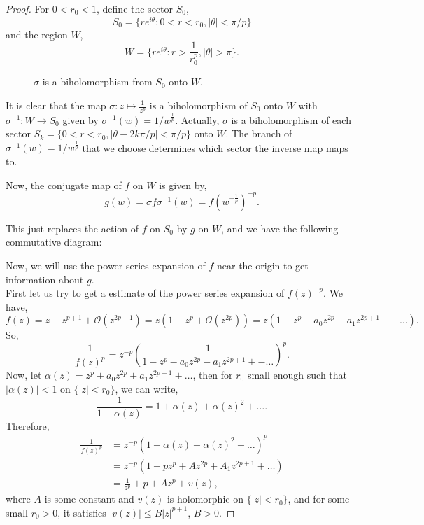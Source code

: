 \begin{proof}
	For \( 0<r_0<1 \), define the sector \( S_0 \), \[
		S_0=\{re^{i\theta}:0<r<r_0,|\theta |<\pi /p \}
	\] and the region \( W \), \[
	W=\{re^{i\theta }:r>\frac{1}{r_0^p},|\theta |>\pi\}
	.\] 

\begin{figure}[ht] \centering
    \caption{$\sigma$ is a biholomorphism from $S_0$ onto $W$.}
    \label{sigmamap}
\end{figure}

	It is clear that the map \( \sigma:z\mapsto \frac{1}{z^p} \) is a biholomorphism
	of \( S_0 \) onto \( W \) with \( \sigma^{-1}:W\to S_0 \) given by \( \sigma^{-1}(w)=1 /w^{\frac{1}{p}} \).
	Actually, \( \sigma  \) is a biholomorphism of each sector \( S_k=\{0<r<r_0,|\theta -2k\pi /p|<\pi /p \} \) onto \( W \). The branch of \( \sigma^{-1}(w)=1 /w^{\frac{1}{p}} \) that we choose determines which sector the inverse map maps to.

	Now, the conjugate map of \( f \) on \( W \) is given by,\[
		g(w)=\sigma f \sigma ^{-1}(w)=f(w^{-\frac{1}{p}})^{-p}
	.\]

	This just replaces the action of \( f \) on \( S_0 \) by \( g \) on \( W \),
	and we have the following commutative diagram:

	Now, we will use the power series expansion of \( f \) near the origin to
	get information about \( g \).\\
	First let us try to get a estimate of the power series expansion of \( f(z)^{-p} \).
	We have, \[
		f(z)=z-z^{p+1}+\mathcal{O}(z^{2p+1})=z(1-z^p+\mathcal{O}(z^{2p}))=z(1-z^p-a_0z^{2p}-a_1z^{2p+1}+-\ldots)
	.\] 
	So, \[
		\frac{1}{f(z)^p}=z^{-p}\left(\frac{1}{1-z^p-a_0z^{2p}-a_1z^{2p+1}+-\ldots}\right)^p
	.\]  
	Now, let \( \alpha(z)=z^p+a_0z^{2p}+a_1z^{2p+1}+\ldots \), 
	then for \( r_0 \) small enough
	such that \( |\alpha(z)|<1 \) on \( \{|z|<r_0\} \), we can write, \[
		\frac{1}{1-\alpha(z)}=1+\alpha(z)+\alpha(z)^2+\ldots 
	.\] 
	Therefore,
	\begin{align*}
		\frac{1}{f(z)^p}&=z^{-p}(1+\alpha(z)+\alpha(z)^2+\ldots )^p\\
						&=z^{-p}(1+pz^p+Az^{2p}+A_1z^{2p+1}+\ldots )\\
						&=\frac{1}{z^p}+p+Az^p+v(z)
	,\end{align*} where \( A \) is some constant and \( v(z) \) is holomorphic
	on \( \{|z|< r_0\} \), and for some small \( r_0>0 \),
	it satisfies \( |v(z)| \le B|z|^{p+1} \), \( B>0 \).


\end{proof}
